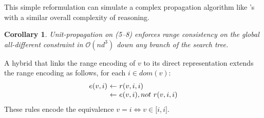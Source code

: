 \documentclass[letterpaper]{article}
\newtheorem{corollary}{Corollary}[theorem]
\newcommand{\dneg}{not\ }
\newcommand{\domain}[1]{dom(#1)}
\begin{document}
This simple reformulation can simulate a complex propagation algorithm like \citeauthor{le96a}'s with a similar overall complexity of reasoning.
\begin{corollary}
Unit-propagation on (5--8) enforces range consistency on the global \emph{all-different} constraint in $\mathcal{O}(nd^3)$ down any branch of the search tree.
\end{corollary}
A hybrid that links the range encoding of $v$ to its direct representation extends the range encoding as follows, for each $i \in \domain{v}$:
\[
\begin{array}{r@{\ \leftarrow\ }l}
e(v, i) & r(v, i, i)\\
& e(v, i), \dneg r(v, i, i)\\
\end{array}
\]
These rules encode the equivalence $v=i \Leftrightarrow v \in \lbrack i, i \rbrack$.
\end{document}
